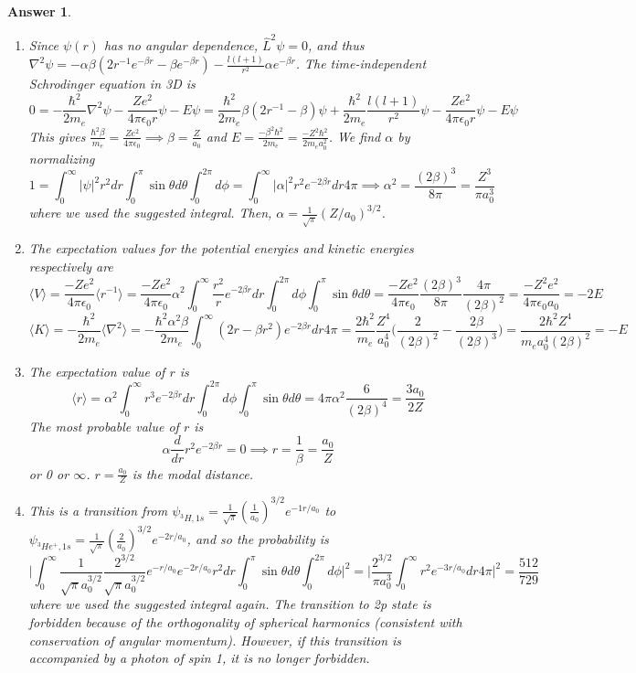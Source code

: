 \documentclass[a4paper]{article}
\newtheorem{ans}{Answer}[subsection]
\theoremstyle{new}
\begin{document}
\newpage
\begin{ans}\leavevmode
\begin{enumerate}[label=(\alph*)]
\item Since $\psi(r)$ has no angular dependence, $\hat{L}^2\psi=0$, and thus $\nabla^2\psi=-\alpha\beta(2r^{-1}e^{-\beta r}-\beta e^{-\beta r})-\frac{l(l+1)}{r^2}\alpha e^{-\beta r}$. The time-independent Schrodinger equation in 3D is
$$0=-\frac{\hbar^2}{2m_e}\nabla^2\psi-\frac{Ze^2}{4\pi\epsilon_0r}\psi-E\psi=\frac{\hbar^2}{2m_e}\beta(2r^{-1}-\beta)\psi+\frac{\hbar^2}{2m_e}\frac{l(l+1)}{r^2}\psi-\frac{Ze^2}{4\pi\epsilon_0 r}\psi-E\psi$$
This gives $\frac{\hbar^2\beta}{m_e}=\frac{Ze^2}{4\pi\epsilon_0}\implies\beta=\frac{Z}{a_0}$ and $E=\frac{-\beta^2\hbar^2}{2m_e}=\frac{-Z^2\hbar^2}{2m_ea_0^2}$. We find $\alpha$ by normalizing
$$1=\int_0^\infty|\psi|^2r^2dr\int_0^\pi\sin\theta d\theta\int_0^{2\pi}d\phi=\int_0^\infty|\alpha|^2r^2e^{-2\beta r}dr4\pi\implies\alpha^2=\frac{(2\beta)^3}{8\pi}=\frac{Z^3}{\pi a_0^3}$$
where we used the suggested integral. Then, $\alpha=\frac{1}{\sqrt{\pi}}(Z/a_0)^{3/2}$.
\item The expectation values for the potential energies and kinetic energies respectively are
$$\langle V\rangle=\frac{-Ze^2}{4\pi\epsilon_0}\langle r^{-1}\rangle=\frac{-Ze^2}{4\pi\epsilon_0}\alpha^2\int_0^\infty \frac{r^2}{r}e^{-2\beta r}dr\int_0^{2\pi}d\phi\int_0^\pi\sin\theta d\theta=\frac{-Ze^2}{4\pi\epsilon_0}\frac{(2\beta)^3}{8\pi}\frac{4\pi}{(2\beta)^2}=\frac{-Z^2e^2}{4\pi\epsilon_0a_0}=-2E$$
$$\langle K\rangle=-\frac{\hbar^2}{2m_e}\langle\nabla^2\rangle=-\frac{\hbar^2\alpha^2\beta}{2m_e}\int_0^\infty(2r-\beta r^2)e^{-2\beta r}dr4\pi=\frac{2\hbar^2}{m_e}\frac{Z^4}{a_0^4}\bigg(\frac{2}{(2\beta)^2}-\frac{2\beta}{(2\beta)^3}\bigg)=\frac{2\hbar^2Z^4}{m_ea_0^4(2\beta)^2}=-E$$
\item The expectation value of $r$ is
$$\langle r\rangle=\alpha^2\int_0^\infty r^3e^{-2\beta r}dr\int_0^{2\pi}d\phi\int_0^\pi\sin\theta d\theta=4\pi\alpha^2\frac{6}{(2\beta)^4}=\frac{3a_0}{2Z}$$
The most probable value of $r$ is
$$\alpha\frac{d}{dr}r^2e^{-2\beta r}=0\implies r=\frac{1}{\beta}=\frac{a_0}{Z}$$
or 0 or $\infty$. $r=\frac{a_0}{Z}$ is the modal distance.
\item This is a transition from $\psi_{^3H,1s}=\frac{1}{\sqrt{\pi}}(\frac{1}{a_0})^{3/2}e^{-1r/a_0}$ to $\psi_{^3He^+,1s}=\frac{1}{\sqrt{\pi}}(\frac{2}{a_0})^{3/2}e^{-2r/a_0}$, and so the probability is
$$\bigg|\int_0^\infty\frac{1}{\sqrt{\pi}a_0^{3/2}}\frac{2^{3/2}}{\sqrt{\pi}a_0^{3/2}}e^{-r/a_0}e^{-2r/a_0}r^2dr\int_0^\pi\sin\theta d\theta\int_0^{2\pi}d\phi\bigg|^2=\bigg|\frac{2^{3/2}}{\pi a_0^3}\int_0^\infty r^2e^{-3r/a_0}dr4\pi\bigg|^2=\frac{512}{729}$$
where we used the suggested integral again. The transition to 2p state is forbidden because of the orthogonality of spherical harmonics (consistent with conservation of angular momentum). However, if this transition is accompanied by a photon of spin 1, it is no longer forbidden.
\end{enumerate}
\end{ans}
\end{document}
